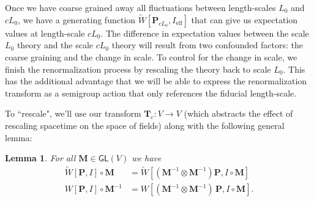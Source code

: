 \documentclass[12pt]{article}
\newcounter{counter}
\theoremstyle{definition}
\theoremstyle{plain}
\newtheorem{lem}[counter]{Lemma}
\begin{document}
Once we have coarse grained away all fluctuations between length-scales $L_0$ and $cL_0$, we have a generating function $\tilde{W}[\mathbf{P}_{cL_0},I_{\text{eff}}]$ that can give us expectation values at length-scale $cL_0$. 
The difference in expectation values between the scale $L_0$ theory and the scale $cL_0$ theory will result from two confounded factors: the coarse graining and the change in scale. To control for the change in scale, we finish the renormalization process by rescaling the theory back to scale $L_0$. 
This has the additional advantage that we will be able to express the renormalization transform as a semigroup action that only references the fiducial length-scale. 

To ``rescale", we'll use our transform $\mathbf{T}_c: V\to V$ (which abstracts the effect of rescaling spacetime on the space of fields) along with the following general lemma:\\

\begin{lem} \label{lem:rescaling}
  For all \(\mathbf{M} \in \mathsf{GL}(V)\) we have
  \begin{align}
    \tilde{W} [\mathbf{P}, I] \circ \mathbf{M}
    &= \tilde{W} [(\mathbf{M}^{-1}\otimes\mathbf{M}^{-1}) \mathbf{P}, I \circ \mathbf{M}] \label{eq:TactsonWtilde}  \\
    W [\mathbf{P}, I]
   \circ \mathbf{M}^{-1} &= W [(\mathbf{M}^{-1}\otimes\mathbf{M}^{-1})
   \, \mathbf{P}, I \circ \mathbf{M}].
  \end{align}
\end{lem}
  
\end{document}

